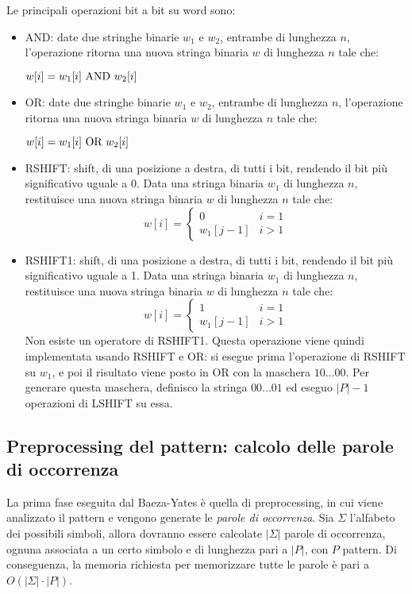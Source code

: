 Le principali operazioni bit a bit su word sono:
\begin{itemize}
    \item AND: date due stringhe binarie $w_1$ e $w_2$, entrambe di lunghezza $n$, l'operazione ritorna una nuova stringa binaria $w$ di lunghezza $n$ tale che:
    \begin{center}
        $w[i] = w_1[i] \textnormal{ AND } w_2[i]$
    \end{center}
    \item OR: date due stringhe binarie $w_1$ e $w_2$, entrambe di lunghezza $n$, l'operazione ritorna una nuova stringa binaria $w$ di lunghezza $n$ tale che:
    \begin{center}
        $w[i] = w_1[i] \textnormal{ OR } w_2[i]$
    \end{center}
    \item RSHIFT: shift, di una posizione a destra, di tutti i bit, rendendo il bit più significativo uguale a 0.
    Data una stringa binaria $w_1$ di lunghezza $n$, restituisce una nuova stringa binaria $w$ di lunghezza $n$ tale che:
    \begin{equation*}
        w[i] = \begin{cases}
            0 & i = 1 \\
            w_1[j-1] & i > 1
        \end{cases}
    \end{equation*}
    \item RSHIFT1: shift, di una posizione a destra, di tutti i bit, rendendo il bit più significativo uguale a 1.
    Data una stringa binaria $w_1$ di lunghezza $n$, restituisce una nuova stringa binaria $w$ di lunghezza $n$ tale che:
    \begin{equation*}
        w[i] = \begin{cases}
            1 & i = 1 \\
            w_1[j-1] & i > 1
        \end{cases}
    \end{equation*}
    Non esiste un operatore di RSHIFT1. Questa operazione viene quindi implementata usando RSHIFT e OR:
    si esegue prima l'operazione di RSHIFT su $w_1$, e poi il risultato viene posto in OR con la maschera $10\ldots00$.
    Per generare questa maschera, definisco la stringa $00\ldots01$ ed eseguo $|P|- 1$ operazioni di LSHIFT su essa.
\end{itemize}

\subsection{Preprocessing del pattern: calcolo delle parole di occorrenza}
La prima fase eseguita dal Baeza-Yates è quella di preprocessing, in cui viene analizzato il pattern e vengono generate le \textit{parole di occorrenza}.
Sia $\Sigma$ l'alfabeto dei possibili simboli, allora dovranno essere calcolate $|\Sigma|$ parole di occorrenza, ognuna associata a un certo simbolo e di lunghezza pari a $|P|$, con $P$ pattern.
Di conseguenza, la memoria richiesta per memorizzare tutte le parole è pari a $O(|\Sigma| \cdot |P|)$.

